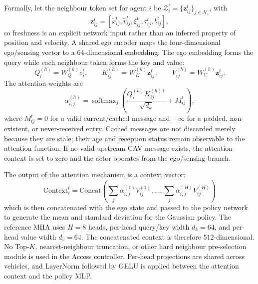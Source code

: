 \documentclass{ieeeaccess}
\begin{document}
Formally, let the neighbour token set for agent $i$ be $\mathcal Z_i^t=\{\mathbf z_{ij}^{t}\}_{j\in\mathcal N_i}$, with
\begin{equation}
\mathbf z_{ij}^{t}
=
[\tilde x_{ij}^{t},\tilde v_{ij}^{t},\xi_{ij}^{t},\tau_{ij}^{t},b_{ij}^{t}],
\end{equation}
so freshness is an explicit network input rather than an inferred property of position and velocity. A shared ego encoder maps the four-dimensional ego/sensing vector to a $64$-dimensional embedding. The ego embedding forms the query while each neighbour token forms the key and value: %
\begin{equation}
Q_i^{(h)}=W_Q^{(h)}e_i^t,\qquad
K_{ij}^{(h)}=W_K^{(h)}\mathbf z_{ij}^{t},\qquad
V_{ij}^{(h)}=W_V^{(h)}\mathbf z_{ij}^{t}.
\end{equation}
The attention weights are
\begin{equation}
\alpha_{i,j}^{(h)}
=
\operatorname{softmax}_j
\left(
\frac{Q_i^{(h)}K_{ij}^{(h)\top}}{\sqrt{d_k}}+M_{ij}^{t}
\right),
\end{equation}
where $M_{ij}^{t}=0$ for a valid current/cached message and $-\infty$ for a padded, non-existent, or never-received entry. Cached messages are not discarded merely because they are stale; their age and reception status remain observable to the attention function. If no valid upstream CAV message exists, the attention context is set to zero and the actor operates from the ego/sensing branch.

The output of the attention mechanism is a context vector:
\begin{equation}
\text{Context}_{i}^{t} = \text{Concat}\left(\sum_j \alpha_{i,j}^{(1)} V_{ij}^{(1)}, \ldots, \sum_j \alpha_{i,j}^{(H)} V_{ij}^{(H)} \right)
\end{equation}
which is then concatenated with the ego state and passed to the policy network to generate the mean and standard deviation for the Gaussian policy. The reference MHA uses $H=8$ heads, per-head query/key width $d_k=64$, and per-head value width $d_v=64$. The concatenated context is therefore $512$-dimensional. No Top-$K$, nearest-neighbour truncation, or other hard neighbour pre-selection module is used in the Access controller. Per-head projections are shared across vehicles, and LayerNorm followed by GELU is applied between the attention context and the policy MLP. %
\end{document}
